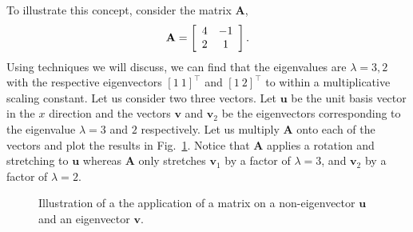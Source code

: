 To illustrate this concept, consider the matrix $\mathbf{A}$,
\begin{align}
  \mathbf{A} = \left[ \begin{array}{c c}
   4 & -1 \\
   2 &  1 \\ \end{array} \right] . \nonumber
\end{align}
Using techniques we will discuss, we can find that the eigenvalues are $\lambda = 3, 2$ with the respective eigenvectors $[ 1 \ 1 ]^\top$ and $[ 1 \ 2 ]^\top$ to within a multiplicative scaling constant. Let us consider two three vectors. Let $\mathbf{u}$ be the unit basis vector in the $x$ direction and the vectors $\mathbf{v}$ and $\mathbf{v}_2$ be the eigenvectors corresponding to the eigenvalue $\lambda = 3$ and $2$ respectively. Let us multiply $\mathbf{A}$  onto each of the vectors and plot the results in Fig.~\ref{Fig:linearAlgebra_illustrationEigenvectors}. Notice that $\mathbf{A}$ applies a rotation and stretching to $\mathbf{u}$ whereas $\mathbf{A}$ only stretches $\mathbf{v}_1$ by a factor of $\lambda = 3$, and $\mathbf{v}_2$ by a factor of $\lambda = 2$. 
\begin{figure}[tb!]
\begin{center}
\caption{Illustration of a the application of a matrix on a non-eigenvector $\mathbf{u}$ and an eigenvector $\mathbf{v}$.}
\label{Fig:linearAlgebra_illustrationEigenvectors}
\end{center}
\end{figure}

